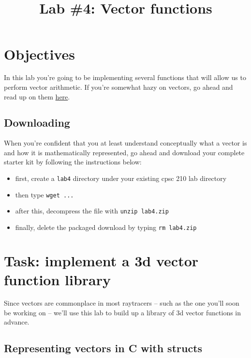 \documentclass[12pt]{article}
\begin{document}
\title{\vspace{-.35in}Lab \#4: Vector functions}
\date{\empty}
\maketitle

\pagestyle{fancy}
\thispagestyle{fancy}

\vspace{-.75in}
\section{Objectives}
In this lab you're going to be implementing several functions that will allow us to perform vector arithmetic. If you're somewhat hazy on vectors, go ahead and read up on them \href{http://www.mathhands.com/104/hw/104c06s08ns.pdf}{here}.

\subsection{Downloading}

When you're confident that you at least understand conceptually what a vector is and how it is mathematically represented, go ahead and download your complete starter kit by following the instructions below:

\begin{itemize}
\item first, create a \texttt{lab4} directory under your existing cpsc 210 lab directory 
\item then type \texttt{wget ...}
\item after this, decompress the file with \texttt{unzip lab4.zip}
\item finally, delete the packaged download by typing \texttt{rm lab4.zip}
\end{itemize}

\section{Task: implement a 3d vector function library}

Since vectors are commonplace in most raytracers -- such as the one you'll soon be working on -- we'll use this lab to build up a library of 3d vector functions in advance. 

\subsection{Representing vectors in C with structs}
\end{document}
